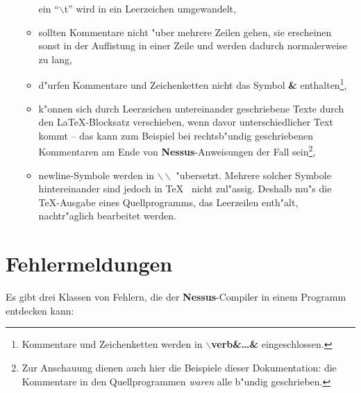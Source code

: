 \begin{itemize}
\begin{itemize}
			ein ``$\backslash$t'' wird in ein Leerzeichen umgewandelt,
		  \item sollten Kommentare nicht "uber mehrere Zeilen gehen, sie erscheinen sonst in
			der Auflistung in einer Zeile und werden dadurch normalerweise zu lang,
		  \item d"urfen Kommentare und Zeichenketten nicht das Symbol {\bf \&}
			enthalten\footnote{Kommentare und Zeichenketten werden in {\bf
			$\backslash$verb\&\dots\&} eingeschlossen.},
		  \item k"onnen sich durch Leerzeichen untereinander geschriebene Texte durch den
			\LaTeX-Blocksatz verschieben, wenn davor unterschiedlicher Text kommt -- das
			kann zum Beispiel bei rechtsb"undig geschriebenen Kommentaren am Ende von
			{\bf Nessus}-Anweisungen der Fall sein\footnote{Zur Anschauung dienen auch
			hier die Beispiele dieser Dokumentation: die Kommentare in den
			Quellprogrammen {\it waren\/} alle b"undig geschrieben.},
		  \item newline-Symbole werden in {\bf $\backslash\backslash$} "ubersetzt. Mehrere
			solcher Symbole hintereinander sind jedoch in \TeX~ nicht zul"assig. Deshalb
			mu"s  die \TeX-Ausgabe eines Quellprogramms, das Leerzeilen enth"alt,
			nachtr"aglich bearbeitet werden.
		\end{itemize}
	\end{itemize}


\clearpage


\section{Fehlermeldungen}

Es gibt drei Klassen von Fehlern, die der {\bf Nessus}-Compiler in
einem Programm entdecken kann:

